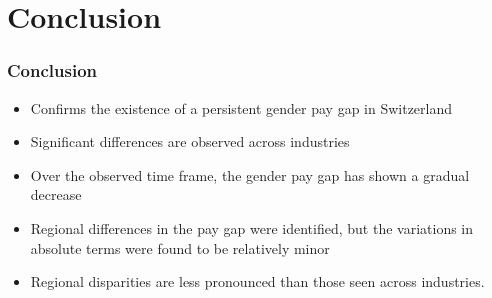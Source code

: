 \documentclass{beamer}
\begin{document}
\section{Conclusion}
\begin{frame}
\frametitle{Conclusion}
\begin{itemize}
  \item Confirms the existence of a persistent gender pay gap in Switzerland
  \item Significant differences are observed across industries
  \item Over the observed time frame, the gender pay gap has shown a gradual decrease
  \item Regional differences in the pay gap were identified, but the variations in absolute terms were found to be relatively minor
  \item Regional disparities are less pronounced than those seen across industries.
  \end{itemize}  
\end{frame}
\end{document}
